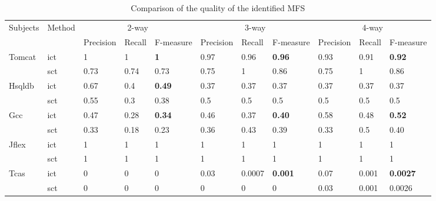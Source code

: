 \documentclass{sig-alternate}
\begin{document}
\begin{table}[htbp]
\center
\caption{Comparison of the quality of the identified MFS}
\label{cm_elda_fglt}
\begin{tabular}{|ll|lll|lll|lll|}
\hline
\multirow{2}{*}{Subjects} & \multirow{2}{*}{Method} & \multicolumn{3}{c|}{2-way} & \multicolumn{3}{c|}{3-way} & \multicolumn{3}{c|}{4-way} \\ \cline{3-11}
                         &                        & Precision & Recall & F-measure   & Precision & Recall & F-measure & Precision & Recall & F-measure   \\ \hline
Tomcat                   & ict                    & 1    & 1    & \textbf{1}     &0.97    & 0.96   & \textbf{0.96}     &  0.93    &  0.91   &  \textbf{0.92 }       \\
                         & sct                   & 0.73    & 0.74    & 0.73      & 0.75     & 1    & 0.86        & 0.75     & 1    & 0.86         \\ \hline
Hsqldb                   & ict                    & 0.67    & 0.4    & \textbf{0.49}      & 0.37    & 0.37   & 0.37       & 0.37    & 0.37   & 0.37        \\
                         & sct                    & 0.55    & 0.3    & 0.38       & 0.5     & 0.5    & 0.5      & 0.5     & 0.5    & 0.5         \\ \hline
Gcc                      & ict                     & 0.47    & 0.28   & \textbf{0.34 }      & 0.46    & 0.37   &\textbf{ 0.40}        & 0.58    & 0.48  &\textbf{ 0.52 }       \\
                         & sct                      & 0.33    & 0.18   & 0.23        & 0.36    & 0.43   & 0.39       & 0.33     & 0.5    & 0.40      \\ \hline
Jflex                    & ict                     & 1       & 1      & 1           & 1       & 1      & 1          & 1       & 1      & 1           \\
                         & sct                   & 1       & 1      & 1        & 1       & 1      & 1         & 1       & 1      & 1           \\ \hline
Tcas                     & ict                    & 0       & 0      & 0          & 0.03    & 0.0007 & \textbf{0.001  }  & 0.07    & 0.001  &\textbf{ 0.0027 }     \\
                         & sct                    & 0       & 0      & 0         & 0       & 0      & 0         & 0.03    & 0.001  & 0.0026 \\ \hline
\end{tabular}
\end{table}
\end{document}
